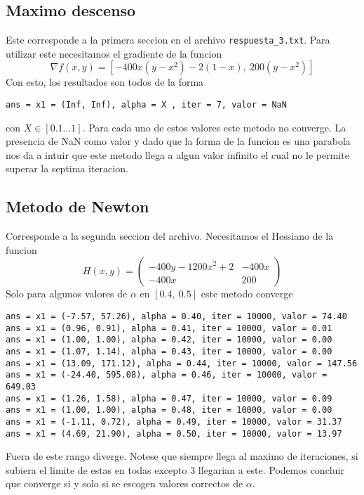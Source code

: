 \documentclass[letterpaper]{article}
\begin{document}
\subsection*{Maximo descenso}
Este corresponde a la primera seccion en el archivo
\texttt{respuesta\_3.txt}. Para utilizar este necesitamos el gradiente de
la funcion
\[ \nabla f (x,y) = [-400 x (y - x^2) - 2 (1-x),\ 200 (y-x^2)] \]
Con esto, los resultados son todos de la forma
\begin{verbatim}
ans = x1 = (Inf, Inf), alpha = X , iter = 7, valor = NaN
\end{verbatim}
con \(X \in [0.1 \dots 1]\). Para cada uno de estos valores este
metodo no converge. La presencia de NaN como valor y dado que la forma de
la funcion es una parabola nos da a intuir que este metodo llega a algun
valor infinito el cual no le permite superar la septima iteracion.

\subsection*{Metodo de Newton}
Corresponde a la segunda seccion del archivo. Necesitamos el Hessiano de
la funcion
\[ H (x,y) =
  \begin{pmatrix}
    -400 y - 1200 x^2 + 2 & -400 x \\
    -400 x & 200
  \end{pmatrix}
\]
Solo para algunos valores de \(\alpha\) en \([0.4 ,\ 0.5]\) este metodo
converge
\begin{verbatim}
ans = x1 = (-7.57, 57.26), alpha = 0.40, iter = 10000, valor = 74.40
ans = x1 = (0.96, 0.91), alpha = 0.41, iter = 10000, valor = 0.01
ans = x1 = (1.00, 1.00), alpha = 0.42, iter = 10000, valor = 0.00
ans = x1 = (1.07, 1.14), alpha = 0.43, iter = 10000, valor = 0.00
ans = x1 = (13.09, 171.12), alpha = 0.44, iter = 10000, valor = 147.56
ans = x1 = (-24.40, 595.08), alpha = 0.46, iter = 10000, valor = 649.03
ans = x1 = (1.26, 1.58), alpha = 0.47, iter = 10000, valor = 0.09
ans = x1 = (1.00, 1.00), alpha = 0.48, iter = 10000, valor = 0.00
ans = x1 = (-1.11, 0.72), alpha = 0.49, iter = 10000, valor = 31.37
ans = x1 = (4.69, 21.90), alpha = 0.50, iter = 10000, valor = 13.97
\end{verbatim}
Fuera de este rango diverge. Notese que siempre llega al maximo de
iteraciones, si subiera el limite de estas en todas excepto \(3\)
llegarian a este. Podemos concluir que converge si y solo si se escogen
valores correctos de \(\alpha\).
\end{document}
